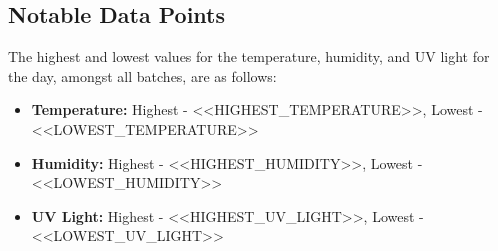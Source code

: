 \documentclass[daily]{engenius}
\begin{document}

\subsection{Notable Data Points}

The highest and lowest values for the temperature, humidity, and UV light for the day, amongst all batches, are as follows:

\begin{itemize}
    \item \textbf{Temperature:} Highest - {<<HIGHEST_TEMPERATURE>>}, Lowest - {<<LOWEST_TEMPERATURE>>}
    \item \textbf{Humidity:} Highest - {<<HIGHEST_HUMIDITY>>}, Lowest - {<<LOWEST_HUMIDITY>>}
    \item \textbf{UV Light:} Highest - {<<HIGHEST_UV_LIGHT>>}, Lowest - {<<LOWEST_UV_LIGHT>>}
\end{itemize}







\end{document}
